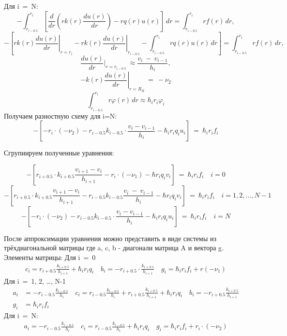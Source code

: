 Для i\ =\ N:
  \[-\int_{r_{i-0.5} }^{r_{i}} \left[\frac{d}{dr}\left(r k(r) \frac{du(r)}{dr}\right) -r q(r)u(r)\right]  \,dr = \int_{r_{i-0.5}}^{r_{i}} r f(r) \,dr, \]
  \[-\left[r k(r)\left.\frac{du(r)}{dr} \right\vert_{r=r_{i}} - r k(r) \left. \frac{du(r)}{dr}\right\vert_{r_{i-0.5}} - \int_{r_{i-0.5}}^{r_i} r q(r) u(r)  \,dr \right]
  = \int_{r_{i-0.5}}^{r_i} r f(r) \,dr, \]
  \[\frac{du(r)}{dr}\vert_{r = r_{i-0.5}}\ \approx \frac{v_{i}\ -\ v_{i-1}}{h_{i}}, \]
  \[-k(r)\left. \frac{du(r)}{dr} \right\vert_{r=R_R}\ =\ -\nu_2 \]
  \[\int_{r_{i-0.5}}^{r_i} r \varphi(r) \,dr \approx \hbar_i r_i \varphi_i \]
Получаем разностную схему для i=N:
\[
  -\left[ -r_i \cdot (-\nu_2) - r_{i-0.5}k_{i-0.5} \cdot \frac{v_i-v_{i-1}}{h_i}- \hbar_ir_iq_iu_i \right]\ =\ \hbar_ir_if_i
\]

Сгрупиируем полученные уравнения:

\[
  -\left[ r_{i+0.5} \cdot k_{i+0.5}\frac{v_{i+1}-v_i}{h_{i+1}} - r_i \cdot (-\nu_1) - \hbar r_i q_i v_i \right]\ =\ \hbar_ir_if_i \quad i = 0
\]
\[
-\left[ r_{i+0.5} \cdot k_{i+0.5}\frac{v_{i+1}-v_i}{h_{i+1}} - r_{i-0.5}k_{i-0.5}\frac{v_{i}\ -\ v_{i-1}}{h_{i}} - \hbar r_i q_i v_i\right]\ =\ \hbar_ir_if_i \quad i = 1, 2, ..., N -1
\]
\[
-\left[ -r_i \cdot (-\nu_2) - r_{i-0.5}k_{i-0.5} \cdot \frac{v_i-v_{i-1}}{h_i}- \hbar_ir_iq_iu_i \right]\ =\ \hbar_ir_if_i \quad i = N
\]

После аппроксимации уравнения можно представить в виде системы из трёхдиагональной матрицы где a, c, b - диагонали матрица A и вектора g. Элементы матрицы:\newline
Для i\ =\ 0
\begin{align*}
  c_i = r_{i+0.5}\frac{k_{i+0.5}}{h_{i+1}} + \hbar_ir_iq_i \quad
  b_i = -r_{i+0.5} \cdot \frac{k_{i+0.5}}{h_{i+1}} \quad
  g_i = \hbar_ir_if_i + r(-\nu_1)
\end{align*}
Для i\ =\ 1, 2, \dots, N-1
\begin{align*}
  a_i &= -r_{i-0.5}\frac{k_{i-0.5}}{h_i} \quad
  c_i = r_{i-0.5}\frac{k_{i-0.5}}{h_i} + r_{i+0.5}\frac{k_{i+0.5}}{h_{i+1}} + \hbar_i r_iq_i \quad
  b_i = -r_{i+0.5}\frac{k_{i+0.5}}{h_{i+1}} \\
  g_i &= \hbar_i r_i f_i
\end{align*}
Для i\ =\ N:
\begin{align*}
  a_i = -r_{i-0.5}\frac{k_{i-0.5}}{h_i} \quad
  c_i = r_{i-0.5}\frac{k_{i-0.5}}{h_i} + \hbar_i r_iq_i \quad
  g_i = \hbar_i r_i f_i + r_i \cdot (-\nu_2)
\end{align*}
